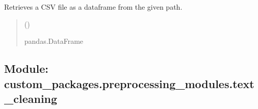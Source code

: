 \documentclass[letterpaper,10pt,english]{sphinxhowto}
\begin{document}
\begin{fulllineitems}
\label{\detokenize{_autosummary/custom_packages.preprocessing_modules.data_collector.get_cleaned_csv_record:custom_packages.preprocessing_modules.data_collector.get_cleaned_csv_record}}
\pysigstartsignatures
\pysiglinewithargsret
{}
{}
{}
\pysigstopsignatures
\sphinxAtStartPar
Retrieves a CSV file as a dataframe from the given path.
\begin{quote}\begin{description}
\sphinxAtStartPar
{} ()

\sphinxAtStartPar
pandas.DataFrame

\end{description}\end{quote}

\end{fulllineitems}



\subsection{Module: custom\_packages.preprocessing\_modules.text\_cleaning}
\label{\detokenize{preprocessing_modules:module-custom-packages-preprocessing-modules-text-cleaning}}
\end{document}
